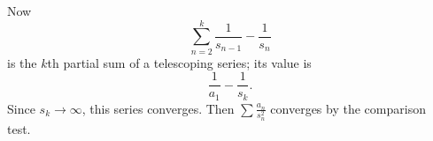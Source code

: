 \documentclass{article}
\begin{document}
\begin{enumerate}[label=\textbf{\arabic*.}]
\begin{enumerate}
Now \[\sum_{n=2}^k \frac{1}{s_{n-1}} - \frac{1}{s_n}\] is the $k$th partial sum of a telescoping series; its value is \[\frac{1}{a_1} - \frac{1}{s_k}.\] Since $s_k\to\infty$, this series converges. Then $\sum\frac{a_n}{s_n^2}$ converges by the comparison test.
\end{enumerate}
\end{enumerate}
\end{document}
